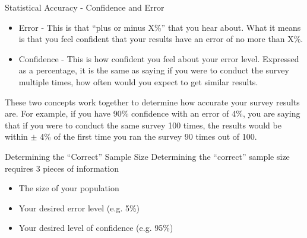 \documentclass[10pt, compress]{beamer}
\begin{document}
\begin{frame}[t]{Statistical Accuracy - Confidence and Error}
    \begin{itemize}
        \item Error - This is that ``plus or minus X\%'' that you hear about. What it means is that you feel confident that your results have an error of no more than X\%.
        \item Confidence - This is how confident you feel about your error level. Expressed as a percentage, it is the same as saying if you were to conduct the survey multiple times, how often would you expect to get similar results.
    \end{itemize}
    \smallskip
    These two concepts work together to determine how accurate your survey results are. For example, if you have 90\% confidence with an error of 4\%, you are saying that if you were to conduct the same survey 100 times, the results would be within $\pm$ 4\% of the first time you ran the survey 90 times out of 100.
\end{frame}

\begin{frame}[t]{Determining the ``Correct'' Sample Size}
    Determining the ``correct'' sample size requires 3 pieces of information
    \begin{itemize}
        \item The size of your population
        \item Your desired error level (e.g. 5\%)
        \item Your desired level of confidence (e.g. 95\%)
    \end{itemize}
\end{frame}

\end{document}
